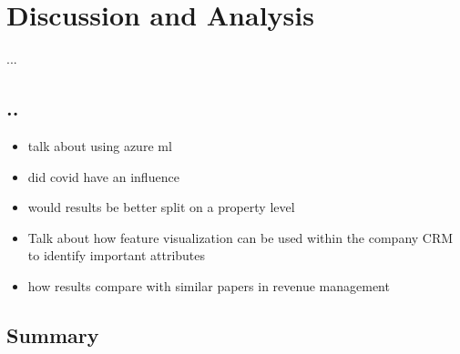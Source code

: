 \chapter{Discussion and Analysis}
...

\section{..}
\begin{itemize}
\item talk about using azure ml 
\item did covid have an influence
\item would results be better split on a property level
\item Talk about how feature visualization can be used within the company CRM to identify important attributes 
\item how results compare with similar papers in revenue management 
\end{itemize}










\section{Summary}
